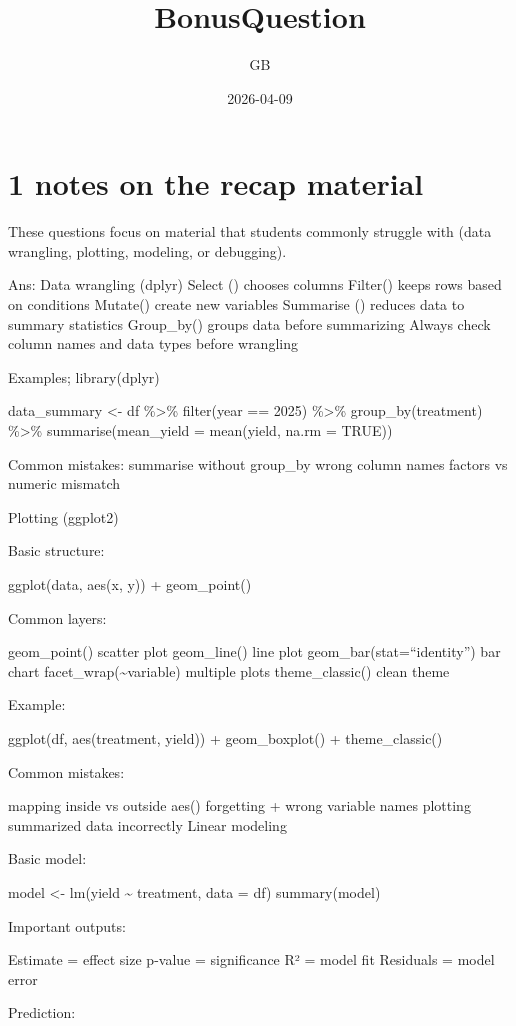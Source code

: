 \documentclass[
]{article}
\title{BonusQuestion}
\author{GB}
\date{2026-04-09}
\begin{document}
\maketitle

\section{1 notes on the recap
material}\label{notes-on-the-recap-material}

These questions focus on material that students commonly struggle with
(data wrangling, plotting, modeling, or debugging).

Ans: Data wrangling (dplyr) Select () chooses columns Filter() keeps
rows based on conditions Mutate() create new variables Summarise ()
reduces data to summary statistics Group\_by() groups data before
summarizing Always check column names and data types before wrangling

Examples; library(dplyr)

data\_summary \textless- df \%\textgreater\% filter(year == 2025)
\%\textgreater\% group\_by(treatment) \%\textgreater\%
summarise(mean\_yield = mean(yield, na.rm = TRUE))

Common mistakes: summarise without group\_by wrong column names factors
vs numeric mismatch

Plotting (ggplot2)

Basic structure:

ggplot(data, aes(x, y)) + geom\_point()

Common layers:

geom\_point() scatter plot geom\_line() line plot
geom\_bar(stat=``identity'') bar chart
facet\_wrap(\textasciitilde variable) multiple plots theme\_classic()
clean theme

Example:

ggplot(df, aes(treatment, yield)) + geom\_boxplot() + theme\_classic()

Common mistakes:

mapping inside vs outside aes() forgetting + wrong variable names
plotting summarized data incorrectly Linear modeling

Basic model:

model \textless- lm(yield \textasciitilde{} treatment, data = df)
summary(model)

Important outputs:

Estimate = effect size p-value = significance R² = model fit Residuals =
model error

Prediction:
\end{document}
